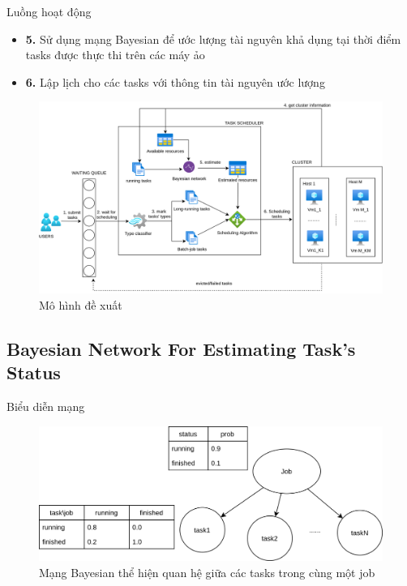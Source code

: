 \documentclass[11pt,xcolor={dvipsnames}, aspectratio=169]{beamer}
\begin{document}
\begin{frame}
	\begin{minipage}[t]{0.4\linewidth}
	\begin{block}{Luồng hoạt động}
		\begin{itemize}
			\item <1-> \textbf{5.} Sử dụng mạng Bayesian để ước lượng tài nguyên khả dụng tại thời điểm tasks được thực thi trên các máy ảo 
			\item <2-> \textbf{6.} Lập lịch cho các tasks với thông tin tài nguyên ước lượng
		\end{itemize}
	\end{block}
	\end{minipage}
	\hfill
	\begin{minipage}[t]{0.59\linewidth}
		\begin{figure}
			\centering
			\includegraphics[scale=0.3]{images/system_flows.png}
			\caption{Mô hình đề xuất}
		\end{figure}
	\end{minipage}
\end{frame}


\subsection{Bayesian Network For Estimating Task's Status}

\begin{frame}
{Biểu diễn mạng}
\begin{figure}[h!]
	\centering 
	\includegraphics[scale=0.6]{images/job_network.png}
	\caption{Mạng Bayesian thể hiện quan hệ giữa các tasks trong cùng một job}
	\label{fig:job_network}
\end{figure}
\end{frame}
\end{document}
